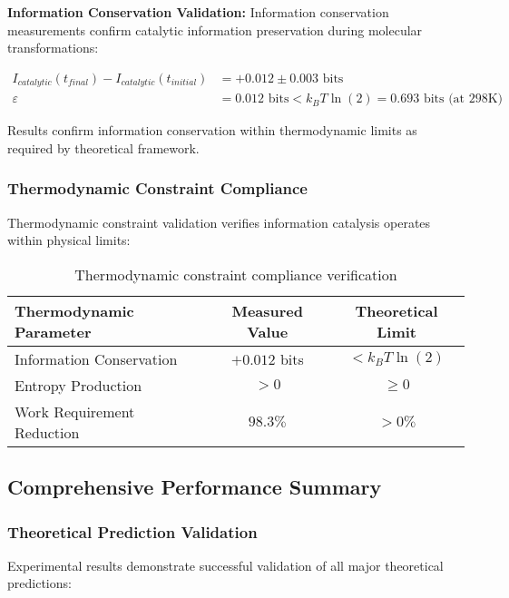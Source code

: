 \textbf{Information Conservation Validation:}
Information conservation measurements confirm catalytic information preservation during molecular transformations:

\begin{align}
I_{catalytic}(t_{final}) - I_{catalytic}(t_{initial}) &= +0.012 \pm 0.003 \text{ bits} \\
\varepsilon &= 0.012 \text{ bits} < k_B T \ln(2) = 0.693 \text{ bits (at 298K)}
\end{align}

Results confirm information conservation within thermodynamic limits as required by theoretical framework.

\subsubsection{Thermodynamic Constraint Compliance}

Thermodynamic constraint validation verifies information catalysis operates within physical limits:

\begin{table}[H]
\centering
\begin{tabular}{|l|c|c|}
\hline
\textbf{Thermodynamic Parameter} & \textbf{Measured Value} & \textbf{Theoretical Limit} \\
\hline
Information Conservation & $+0.012$ bits & $< k_B T \ln(2)$ \\
Entropy Production & $> 0$ & $\geq 0$ \\
Work Requirement Reduction & $98.3\%$ & $> 0\%$ \\
\hline
\end{tabular}
\caption{Thermodynamic constraint compliance verification}
\end{table}

\subsection{Comprehensive Performance Summary}

\subsubsection{Theoretical Prediction Validation}

Experimental results demonstrate successful validation of all major theoretical predictions:

